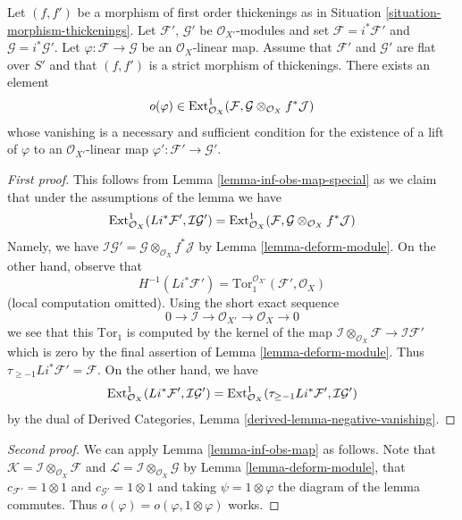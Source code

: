 \begin{lemma}
\label{lemma-inf-obs-map-rel}
Let $(f, f')$ be a morphism of first
order thickenings as in Situation \ref{situation-morphism-thickenings}.
Let $\mathcal{F}'$, $\mathcal{G}'$ be $\mathcal{O}_{X'}$-modules and set
$\mathcal{F} = i^*\mathcal{F}'$ and $\mathcal{G} = i^*\mathcal{G}'$.
Let $\varphi : \mathcal{F} \to \mathcal{G}$ be an $\mathcal{O}_X$-linear map.
Assume that $\mathcal{F}'$ and $\mathcal{G}'$ are flat over $S'$ and
that $(f, f')$ is a strict morphism of thickenings. There exists an element
$$
o(\varphi) \in  \mathop{\mathrm{Ext}}\nolimits^1_{\mathcal{O}_X}(\mathcal{F},
\mathcal{G} \otimes_{\mathcal{O}_X} f^*\mathcal{J})
$$
whose vanishing is a necessary and sufficient condition for the
existence of a lift of $\varphi$ to an $\mathcal{O}_{X'}$-linear map
$\varphi' : \mathcal{F}' \to \mathcal{G}'$.
\end{lemma}

\begin{proof}[First proof]
This follows from Lemma \ref{lemma-inf-obs-map-special}
as we claim that under the assumptions of the lemma we have
$$
\mathop{\mathrm{Ext}}\nolimits^1_{\mathcal{O}_X}(Li^*\mathcal{F}',
\mathcal{I}\mathcal{G}') =
\mathop{\mathrm{Ext}}\nolimits^1_{\mathcal{O}_X}(\mathcal{F},
\mathcal{G} \otimes_{\mathcal{O}_X} f^*\mathcal{J})
$$
Namely, we have
$\mathcal{I}\mathcal{G}' =
\mathcal{G} \otimes_{\mathcal{O}_X} f^*\mathcal{J}$
by Lemma \ref{lemma-deform-module}.
On the other hand, observe that
$$
H^{-1}(Li^*\mathcal{F}') =
\text{Tor}_1^{\mathcal{O}_{X'}}(\mathcal{F}', \mathcal{O}_X)
$$
(local computation omitted). Using the short exact sequence
$$
0 \to \mathcal{I} \to \mathcal{O}_{X'} \to \mathcal{O}_X \to 0
$$
we see that this $\text{Tor}_1$ is computed by the kernel of the map
$\mathcal{I} \otimes_{\mathcal{O}_X} \mathcal{F} \to \mathcal{I}\mathcal{F}'$
which is zero by the final assertion of Lemma \ref{lemma-deform-module}.
Thus $\tau_{\geq -1}Li^*\mathcal{F}' = \mathcal{F}$.
On the other hand, we have
$$
\mathop{\mathrm{Ext}}\nolimits^1_{\mathcal{O}_X}(Li^*\mathcal{F}',
\mathcal{I}\mathcal{G}') =
\mathop{\mathrm{Ext}}\nolimits^1_{\mathcal{O}_X}(\tau_{\geq -1}Li^*\mathcal{F}',
\mathcal{I}\mathcal{G}')
$$
by the dual of
Derived Categories, Lemma \ref{derived-lemma-negative-vanishing}.
\end{proof}

\begin{proof}[Second proof]
We can apply Lemma \ref{lemma-inf-obs-map} as follows. Note that
$\mathcal{K} = \mathcal{I} \otimes_{\mathcal{O}_X} \mathcal{F}$ and
$\mathcal{L} = \mathcal{I} \otimes_{\mathcal{O}_X} \mathcal{G}$
by Lemma \ref{lemma-deform-module}, that
$c_{\mathcal{F}'} = 1 \otimes 1$ and $c_{\mathcal{G}'} = 1 \otimes 1$
and taking $\psi = 1 \otimes \varphi$ the diagram of the lemma
commutes. Thus $o(\varphi) = o(\varphi, 1 \otimes \varphi)$
works.
\end{proof}

